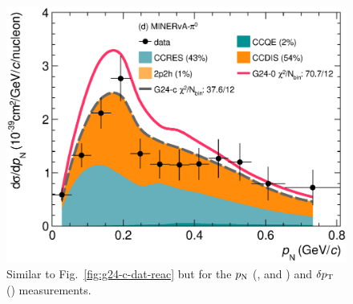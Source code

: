 \begin{figure}
    \includegraphics[width=\dbfigwid\textwidth]{figures/0026-min_pi0_pn_reac_decomp.eps}
    \caption{\label{fig:g24-c-pn-reac}  
    Similar to Fig.~\ref{fig:g24-c-dat-reac} but for the $p_\textrm{N}$ (\ttkpip, \minzpi and \minpiz) and $\delta p_\textrm{T}$ (\ttkzpi) measurements. 
    } 
\end{figure}

